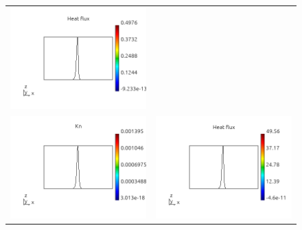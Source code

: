 \documentclass[review]{elsarticle}
\begin{document}
\begin{figure}[tbh]
\begin{center}
\begin{tabular}{cc}
      \includegraphics[width=\psize\textwidth]{figs/hflux_p51D1e12.png} \\
      \includegraphics[width=\psize\textwidth]{figs/Kn_p51D1e10.png} &
      \includegraphics[width=\psize\textwidth]{figs/hflux_p51D1e10.png} \\

\end{tabular}
\end{center}
\end{figure}
\end{document}
